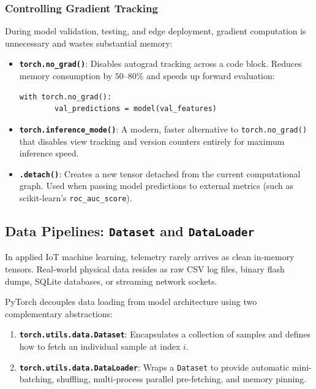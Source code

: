 \subsubsection{Controlling Gradient Tracking}

During model validation, testing, and edge deployment, gradient computation is unnecessary and wastes substantial memory:
\begin{itemize}
    \item \textbf{\texttt{torch.no\_grad()}}: Disables autograd tracking across a code block. Reduces memory consumption by $50\text{--}80\%$ and speeds up forward evaluation:
    \begin{lstlisting}[style=pythonstyle]
    with torch.no_grad():
        val_predictions = model(val_features)
    \end{lstlisting}
    \item \textbf{\texttt{torch.inference\_mode()}}: A modern, faster alternative to \texttt{torch.no\_grad()} that disables view tracking and version counters entirely for maximum inference speed.
    \item \textbf{\texttt{.detach()}}: Creates a new tensor detached from the current computational graph. Used when passing model predictions to external metrics (such as scikit-learn's \texttt{roc\_auc\_score}).
\end{itemize}

\subsection{Data Pipelines: \texttt{Dataset} and \texttt{DataLoader}}\label{subsec:dataset_dataloader}

In applied IoT machine learning, telemetry rarely arrives as clean in-memory tensors. Real-world physical data resides as raw CSV log files, binary flash dumps, SQLite databases, or streaming network sockets.

PyTorch decouples data loading from model architecture using two complementary abstractions:
\begin{enumerate}
    \item \textbf{\texttt{torch.utils.data.Dataset}}: Encapsulates a collection of samples and defines how to fetch an individual sample at index $i$.
    \item \textbf{\texttt{torch.utils.data.DataLoader}}: Wraps a \texttt{Dataset} to provide automatic mini-batching, shuffling, multi-process parallel pre-fetching, and memory pinning.
\end{enumerate}

